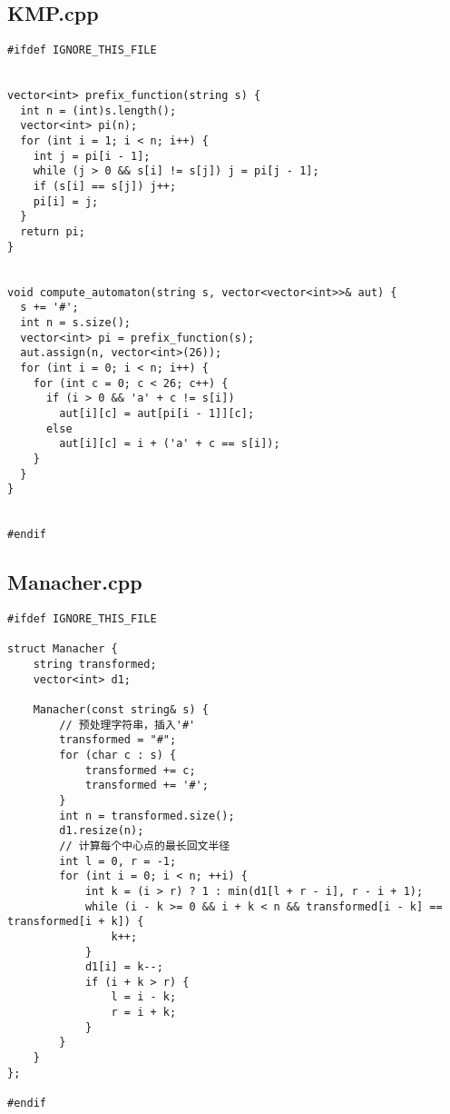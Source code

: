 \documentclass[UTF8, a4paper, titlepage, twoside]{ctexart}
\begin{document}
\subsection{KMP.cpp}
\begin{verbatim}
#ifdef IGNORE_THIS_FILE


vector<int> prefix_function(string s) {
  int n = (int)s.length();
  vector<int> pi(n);
  for (int i = 1; i < n; i++) {
    int j = pi[i - 1];
    while (j > 0 && s[i] != s[j]) j = pi[j - 1];
    if (s[i] == s[j]) j++;
    pi[i] = j;
  }
  return pi;
}


void compute_automaton(string s, vector<vector<int>>& aut) {
  s += '#';
  int n = s.size();
  vector<int> pi = prefix_function(s);
  aut.assign(n, vector<int>(26));
  for (int i = 0; i < n; i++) {
    for (int c = 0; c < 26; c++) {
      if (i > 0 && 'a' + c != s[i])
        aut[i][c] = aut[pi[i - 1]][c];
      else
        aut[i][c] = i + ('a' + c == s[i]);
    }
  }
}


#endif
\end{verbatim}

\subsection{Manacher.cpp}
\begin{verbatim}
#ifdef IGNORE_THIS_FILE

struct Manacher {
    string transformed;
    vector<int> d1;

    Manacher(const string& s) {
        // 预处理字符串，插入'#'
        transformed = "#";
        for (char c : s) {
            transformed += c;
            transformed += '#';
        }
        int n = transformed.size();
        d1.resize(n);
        // 计算每个中心点的最长回文半径
        int l = 0, r = -1;
        for (int i = 0; i < n; ++i) {
            int k = (i > r) ? 1 : min(d1[l + r - i], r - i + 1);
            while (i - k >= 0 && i + k < n && transformed[i - k] == transformed[i + k]) {
                k++;
            }
            d1[i] = k--;
            if (i + k > r) {
                l = i - k;
                r = i + k;
            }
        }
    }
};

#endif
\end{verbatim}
\end{document}
